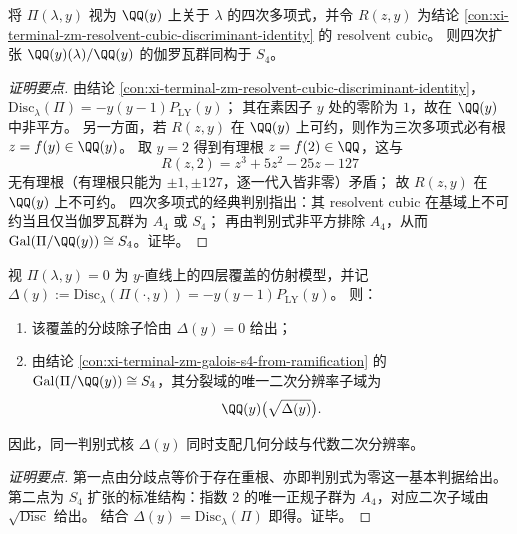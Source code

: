 \begin{conclusion}[四次谱方程的泛型伽罗瓦群为 \(S_{4}\)]\label{con:xi-terminal-zm-galois-s4-from-ramification}
将 \(\Pi(\lambda,y)\) 视为 \(\QQ(y)\) 上关于 \(\lambda\) 的四次多项式，并令 \(R(z,y)\) 为结论 \ref{con:xi-terminal-zm-resolvent-cubic-discriminant-identity} 的 resolvent cubic。
则四次扩张 \(\QQ(y)(\lambda)/\QQ(y)\) 的伽罗瓦群同构于 \(S_{4}\)。
\end{conclusion}
\begin{proof}[证明要点]
由结论 \ref{con:xi-terminal-zm-resolvent-cubic-discriminant-identity}，
\(
\mathrm{Disc}_{\lambda}(\Pi)=-y(y-1)P_{\mathrm{LY}}(y)
\)；
其在素因子 \(y\) 处的零阶为 \(1\)，故在 \(\QQ(y)\) 中非平方。
另一方面，若 \(R(z,y)\) 在 \(\QQ(y)\) 上可约，则作为三次多项式必有根 \(z=f(y)\in\QQ(y)\)。
取 \(y=2\) 得到有理根 \(z=f(2)\in\QQ\)，这与
\[
R(z,2)=z^{3}+5z^{2}-25z-127
\]
无有理根（有理根只能为 \(\pm1,\pm127\)，逐一代入皆非零）矛盾；
故 \(R(z,y)\) 在 \(\QQ(y)\) 上不可约。
四次多项式的经典判别指出：其 resolvent cubic 在基域上不可约当且仅当伽罗瓦群为 \(A_{4}\) 或 \(S_{4}\)；
再由判别式非平方排除 \(A_{4}\)，从而 \(\mathrm{Gal}(\Pi/\QQ(y))\cong S_{4}\)。证毕。
\end{proof}

\begin{conclusion}\label{con:xi-terminal-zm-discriminant-dual-role}
视 \(\Pi(\lambda,y)=0\) 为 \(y\)-直线上的四层覆盖的仿射模型，并记
\(
\Delta(y):=\mathrm{Disc}_{\lambda}(\Pi(\cdot,y))=-y(y-1)P_{\mathrm{LY}}(y)
\)。
则：
\begin{enumerate}
  \item 该覆盖的分歧除子恰由 \(\Delta(y)=0\) 给出；
  \item 由结论 \ref{con:xi-terminal-zm-galois-s4-from-ramification} 的 \(\mathrm{Gal}(\Pi/\QQ(y))\cong S_{4}\)，其分裂域的唯一二次分辨率子域为
  \[
  \QQ(y)\bigl(\sqrt{\Delta(y)}\bigr).
  \]
\end{enumerate}
因此，同一判别式核 \(\Delta(y)\) 同时支配几何分歧与代数二次分辨率。
\end{conclusion}
\begin{proof}[证明要点]
第一点由分歧点等价于存在重根、亦即判别式为零这一基本判据给出。
第二点为 \(S_{4}\) 扩张的标准结构：指数 \(2\) 的唯一正规子群为 \(A_{4}\)，对应二次子域由 \(\sqrt{\mathrm{Disc}}\) 给出。
结合 \(\Delta(y)=\mathrm{Disc}_{\lambda}(\Pi)\) 即得。证毕。
\end{proof}


